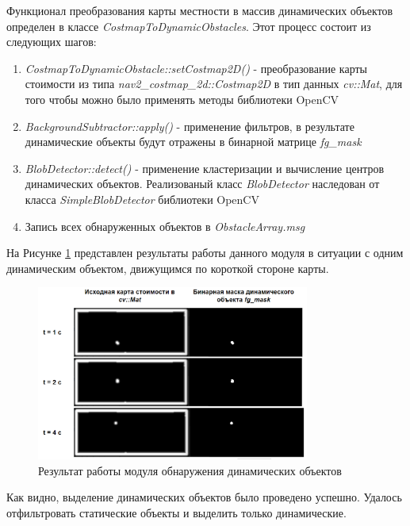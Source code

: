 Функционал преобразования карты местности в массив динамических объектов определен в классе \textit{CostmapToDynamicObstacles}. Этот процесс состоит из следующих шагов:
\begin{enumerate}
    \item \textit{CostmapToDynamicObstacle::setCostmap2D()} - преобразование карты стоимости из типа \textit{nav2\_costmap\_2d::Costmap2D} в тип данных \textit{cv::Mat}, для того чтобы можно было применять методы библиотеки OpenCV
    \item \textit{BackgroundSubtractor::apply()} - применение фильтров, в результате динамические объекты будут отражены в бинарной матрице \textit{fg\_mask} 
    \item \textit{BlobDetector::detect()} - применение кластеризации и вычисление центров динамических объектов. Реализованый класс \textit{BlobDetector} наследован от класса \textit{SimpleBlobDetector} библиотеки OpenCV \cite{simple-blob-opencv}
    \item Запись всех обнаруженных объектов в \textit{ObstacleArray.msg}
\end{enumerate}

На Рисунке \ref*{fig:example_costamp_converter} представлен результаты работы данного модуля в ситуации с одним динамическим объектом, движущимся по короткой стороне карты.

\begin{figure}[H]
    \centering
    \includegraphics[width=0.8\textwidth]{images/chap_3/example_costamp_converter.png}
    \caption{Результат работы модуля обнаружения динамических объектов}
    \label{fig:example_costamp_converter}
\end{figure}

Как видно, выделение динамических объектов было проведено успешно. Удалось отфильтровать статические объекты и выделить только динамические. 

